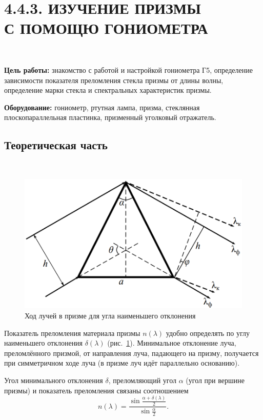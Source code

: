 \documentclass[12pt]{article}
\begin{document}
    \section*{4.4.3. ИЗУЧЕНИЕ ПРИЗМЫ\\С ПОМОЩЮ ГОНИОМЕТРА}
    \ \par
    \textbf{Цель работы:} знакомство с работой и настройкой гониометра Г5,
    определение зависимости показателя преломления стекла призмы от длины волны,
    определение марки стекла и спектральных характеристик призмы.

    \textbf{Оборудование:} гониометр, ртутная лампа, призма, стеклянная плоскопараллельная пластинка,
    призменный уголковый отражатель.

    \subsection*{Теоретическая часть}
    \ \par

    \begin{figure}
        \centering
        \includegraphics[width=0.8\linewidth]{pic/theory}
        \caption{Ход лучей в призме для угла наименьшего отклонения}
        \label{fig:fig1}
    \end{figure}

    Показатель преломления материала призмы $n(\lambda)$ удобно определять
    по углу наименьшего отклонения $\delta(\lambda)$ (рис.\ \ref{fig:fig1}).
    Минимальное отклонение луча, преломлённого призмой, от направления луча, падающего
    на призму, получается при симметричном ходе луча (в призме луч идёт
    параллельно основанию).

    Угол минимального отклонения $\delta$, преломляющий угол $\alpha$ (угол при вершине призмы) и показатель преломления
    связаны соотношением
    \begin{equation}
        \label{eq:eq1}
        n(\lambda) = \frac{\sin \frac{\alpha + \delta(\lambda)}{2}}{\sin \frac{\alpha}{2}}.
    \end{equation}
\end{document}
